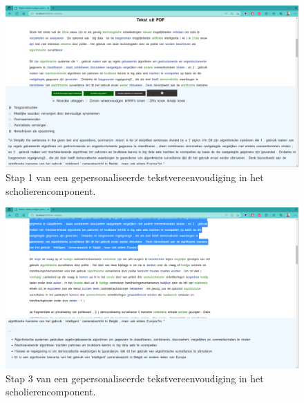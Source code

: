 \begin{center}
	\begin{figure}[H]
		\includegraphics[width=\linewidth]{img/proto-opsomming-1.png}
		\caption{Stap 1 van een gepersonaliseerde tekstvereenvoudiging in het scholierencomponent.}
		\label{img:proto-scholieren-step-1}
	\end{figure}
\end{center}

\begin{center}
	\begin{figure}[H]
		\includegraphics[width=\linewidth]{img/proto-opsomming-3.png}
		\caption{Stap 3 van een gepersonaliseerde tekstvereenvoudiging in het scholierencomponent.}
		\label{img:proto-scholieren-step-3}
	\end{figure}
\end{center}

